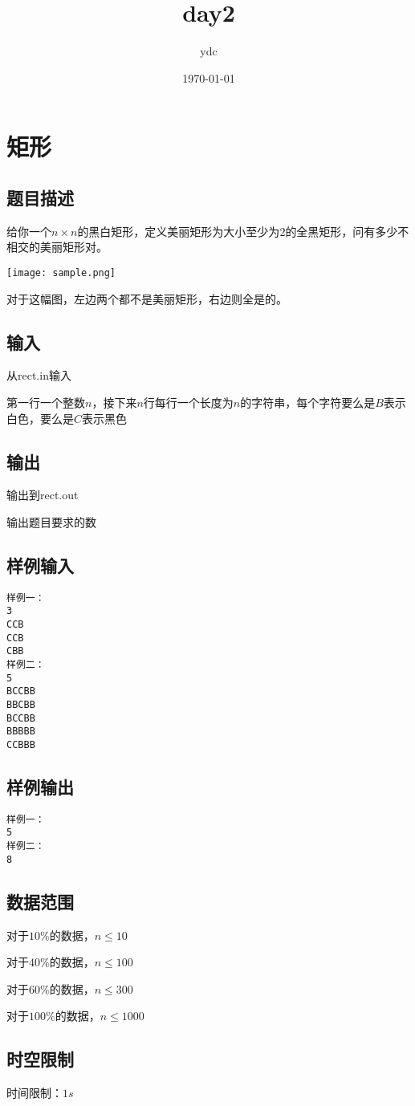 \documentclass{ctexart}
\begin{document}
\title{day2}
\author{ydc}
\date{\today}
\maketitle
\section{矩形}
\subsection{题目描述}
给你一个$n \times n$的黑白矩形，定义美丽矩形为大小至少为$2$的全黑矩形，问有多少不相交的美丽矩形对。

\texttt{[image: sample.png]}

对于这幅图，左边两个都不是美丽矩形，右边则全是的。
\subsection{输入}
从rect.in输入

第一行一个整数$n$，接下来$n$行每行一个长度为$n$的字符串，每个字符要么是$B$表示白色，要么是$C$表示黑色
\subsection{输出}
输出到rect.out

输出题目要求的数
\subsection{样例输入}
\begin{verbatim}
样例一：
3
CCB
CCB
CBB
样例二：
5 	 
BCCBB 	 
BBCBB 	 
BCCBB 	 
BBBBB 	 
CCBBB
\end{verbatim}
\subsection{样例输出}
\begin{verbatim}
样例一：
5
样例二：
8
\end{verbatim}
\subsection{数据范围}
对于$10\%$的数据，$n \le 10$

对于$40\%$的数据，$n \le 100$

对于$60\%$的数据，$n \le 300$

对于$100\%$的数据，$n \le 1000$
\subsection{时空限制}
时间限制：$1s$
\end{document}
